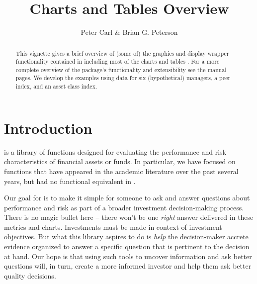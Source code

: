 \documentclass[12pt,letterpaper,english]{article}
\begin{document}
\author {Peter Carl \& Brian G. Peterson}

\title{ Charts and Tables Overview}





\makeatletter
\makeatother
\maketitle

\begin{abstract}
  This vignette gives a brief overview of (some of) the graphics and display wrapper
  functionality contained in  including most of the
  charts and tables . For a more complete overview of the package's functionality
  and extensibility see the manual pages.  We develop the examples using data
  for six (hypothetical) managers, a peer index, and an asset class index.
\end{abstract}

\tableofcontents

\section{Introduction}

 is a library of functions
designed for evaluating the performance and risk characteristics of
financial assets or funds. In particular, we have focused on functions
that have appeared in the academic literature over the past several
years, but had no functional equivalent in \R.

Our goal for  is to make it
simple for someone to ask and answer questions about performance and
risk as part of a broader investment decision-making process. There
is no magic bullet here -- there won't be one \emph{right} answer
delivered in these metrics and charts. Investments must be made in
context of investment objectives. But what this library aspires to
do is \emph{help} the decision-maker accrete evidence organized to
answer a specific question that is pertinent to the decision at hand.
Our hope is that using such tools to uncover information and ask better
questions will, in turn, create a more informed investor and help
them ask better quality decisions.
\end{document}
